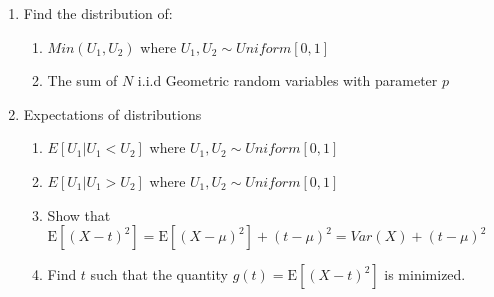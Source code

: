 \begin{enumerate}
\item Find the distribution of:
\begin{enumerate}
\item $Min(U_1, U_2)$ where $U_1, U_2 \sim Uniform[0, 1]$

\vspace{8cm}

\item The sum of $N$ i.i.d Geometric random variables with parameter $p$

\end{enumerate}
\clearpage

\item Expectations of distributions
\begin{enumerate}
\item $E[U_1 | U_1 < U_2]$ where $U_1, U_2 \sim Uniform[0,1]$
\vspace{5cm}


\item $E[U_1 | U_1 > U_2]$ where $U_1, U_2 \sim Uniform[0, 1]$
\vspace{5cm}


\item Show that $\mathrm{E}[(X-t)^2]  = \mathrm{E}[(X-\mu)^2] + (t-\mu)^2 = Var(X) + (t-\mu)^2$
\vspace{5cm}


\item Find $t$ such that the quantity $g(t) = \mathrm{E}[(X-t)^2]$ is minimized.

\end{enumerate}
\end{enumerate}